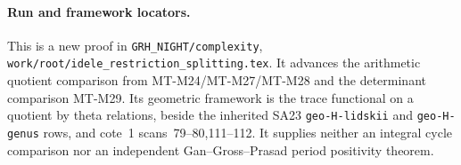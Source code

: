 \paragraph{Run and framework locators.}
This is a new proof in
\texttt{GRH\_NIGHT/complexity},
\texttt{work/root/idele\_restriction\_splitting.tex}.
It advances the arithmetic
quotient comparison from
MT-M24/MT-M27/MT-M28 and
the determinant comparison
MT-M29. Its geometric
framework is the trace
functional on a quotient
by theta relations, beside
the inherited SA23
\texttt{geo-H-lidskii}
and \texttt{geo-H-genus}
rows, and cote~1
scans~79--80,111--112.
It supplies neither an
integral cycle comparison
nor an independent
Gan--Gross--Prasad
period positivity theorem.
